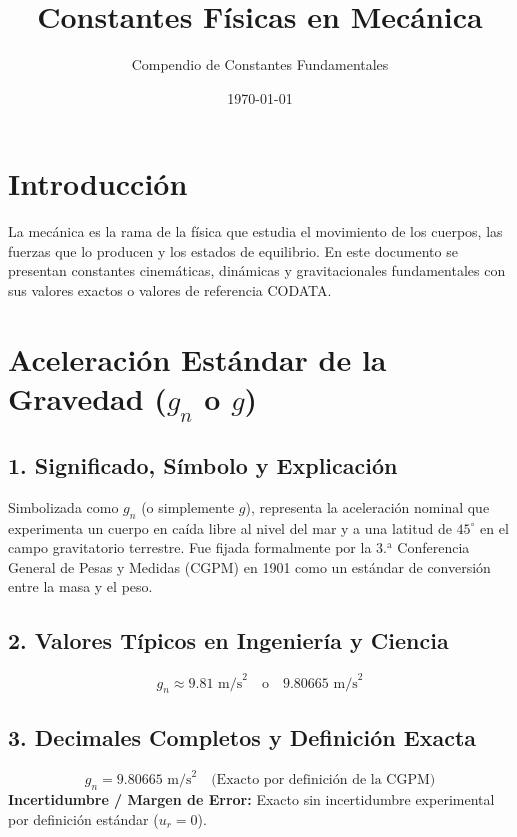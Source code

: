 \documentclass[12pt,a4paper]{article}
\title{\textbf{Constantes Físicas en Mecánica}}
\author{Compendio de Constantes Fundamentales}
\date{\today}
\begin{document}
\maketitle

\section*{Introducción}
La mecánica es la rama de la física que estudia el movimiento de los cuerpos, las fuerzas que lo producen y los estados de equilibrio. En este documento se presentan constantes cinemáticas, dinámicas y gravitacionales fundamentales con sus valores exactos o valores de referencia CODATA.

\section{Aceleración Estándar de la Gravedad ($g_n$ o $g$)}

\subsection*{1. Significado, Símbolo y Explicación}
Simbolizada como $g_n$ (o simplemente $g$), representa la aceleración nominal que experimenta un cuerpo en caída libre al nivel del mar y a una latitud de $45^\circ$ en el campo gravitatorio terrestre. Fue fijada formalmente por la $3.^{\text{a}}$ Conferencia General de Pesas y Medidas (CGPM) en 1901 como un estándar de conversión entre la masa y el peso.

\subsection*{2. Valores Típicos en Ingeniería y Ciencia}
\begin{equation*}
g_n \approx 9.81 \text{ m/s}^2 \quad \text{o} \quad 9.80665 \text{ m/s}^2
\end{equation*}

\subsection*{3. Decimales Completos y Definición Exacta}
\begin{equation*}
g_n = 9.80665 \text{ m/s}^2 \quad \text{(Exacto por definición de la CGPM)}
\end{equation*}
\textbf{Incertidumbre / Margen de Error:} Exacto sin incertidumbre experimental por definición estándar ($u_r = 0$).
\end{document}
